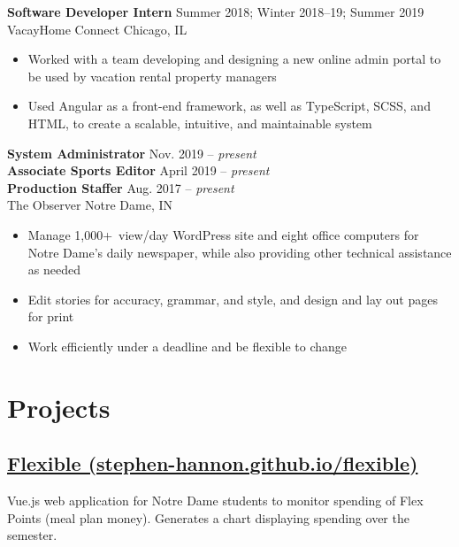 \documentclass[letterpaper,10pt]{article}
\newcommand{\present}{{\itshape present}}
\newcommand{\employmentspace}{\vspace{-5pt}}
\begin{document}
\begin{minipage}[t]{\dimexpr.67\textwidth-.5\columnsep}
\textbf{Software Developer Intern} \hfill Summer 2018; Winter 2018--19; Summer 2019 \\
VacayHome Connect \hfill Chicago, IL

\employmentspace
\begin{itemize}
    \item Worked with a team developing and designing a new online admin portal to be used by vacation rental property managers
    \item Used Angular as a front-end framework, as well as TypeScript, SCSS, and HTML, to create a scalable, intuitive, and maintainable system
\end{itemize}

\textbf{System Administrator} \hfill Nov. 2019 -- \present \\
\textbf{Associate Sports Editor} \hfill April 2019 -- \present \\
\textbf{Production Staffer} \hfill Aug. 2017 -- \present \\
The Observer \hfill Notre Dame, IN

\employmentspace
\begin{itemize}
    \item Manage 1,000+~view/day WordPress site and eight office computers for Notre Dame’s daily newspaper, while also providing other technical assistance as needed
    \item Edit stories for accuracy, grammar, and style, and design and lay out pages for print
    \item Work efficiently under a deadline and be flexible to change
\end{itemize}

\section{Projects}

\subsection[Flexible]{\href{https://stephen-hannon.github.io/flexible/}{Flexible (stephen-hannon.github.io/flexible)}}
Vue.js web application for Notre Dame students to monitor spending of Flex Points (meal plan money). Generates a chart displaying spending over the semester.


\end{minipage}
\end{document}
